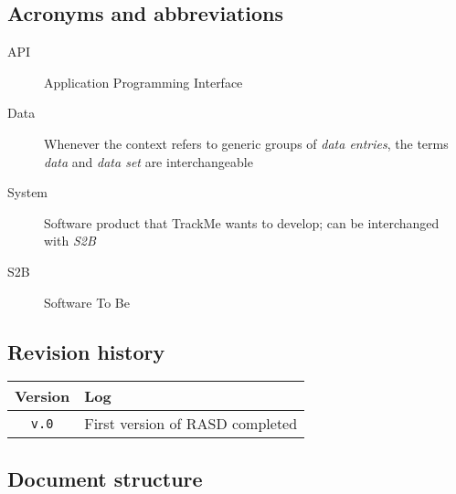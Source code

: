  \subsection{Acronyms and abbreviations}

      \begin{description}
        \item[API] Application Programming Interface
        \item[Data] Whenever the context refers to generic groups of \textit{data entries}, the terms \textit{data} and \textit{data set} are interchangeable
        \item[System] Software product that TrackMe wants to develop; can be interchanged with \textit{S2B}
        \item[S2B] Software To Be
      \end{description}

  \subsection{Revision history}

  \label{sec:revhistory}
    \begin{table}[!h]
      \begin{tabular}{|c|l|}
        \hline
        \textbf{Version}                & \textbf{Log} \\ \hline
        \texttt{v.0} &
          First version of RASD completed
        \\ \hline
      \end{tabular}
    \end{table}


  \subsection{Document structure}

